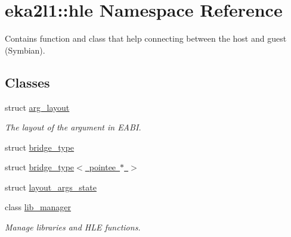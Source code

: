 \hypertarget{namespaceeka2l1_1_1hle}{}\section{eka2l1\+:\+:hle Namespace Reference}
\label{namespaceeka2l1_1_1hle}


Contains function and class that help connecting between the host and guest (Symbian).  


\subsection*{Classes}
\begin{DoxyCompactItemize}
\item 
struct \mbox{\hyperlink{structeka2l1_1_1hle_1_1arg__layout}{arg\+\_\+layout}}
\begin{DoxyCompactList}\small\item\em The layout of the argument in E\+A\+BI. \end{DoxyCompactList}\item 
struct \mbox{\hyperlink{structeka2l1_1_1hle_1_1bridge__type}{bridge\+\_\+type}}
\item 
struct \mbox{\hyperlink{structeka2l1_1_1hle_1_1bridge__type_3_01pointee_01_5_01_4}{bridge\+\_\+type$<$ pointee $\ast$ $>$}}
\item 
struct \mbox{\hyperlink{structeka2l1_1_1hle_1_1layout__args__state}{layout\+\_\+args\+\_\+state}}
\item 
class \mbox{\hyperlink{classeka2l1_1_1hle_1_1lib__manager}{lib\+\_\+manager}}
\begin{DoxyCompactList}\small\item\em Manage libraries and H\+LE functions. \end{DoxyCompactList}\end{DoxyCompactItemize}
